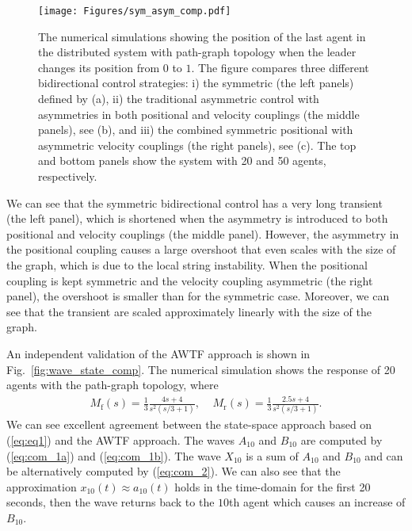 \documentclass[10pt,twocolumn,twoside]{IEEEtran}
\theoremstyle{definition}
\begin{document}
\begin{figure*}[ht]
 \centering
  \texttt{[image: Figures/sym\_asym\_comp.pdf]}
  \caption{
The numerical simulations showing the position of the last agent in the distributed system with path-graph topology when the leader changes its position from $0$ to $1$. The figure compares three different bidirectional control strategies: i) the symmetric (the left panels) defined by (a), ii) the traditional asymmetric control with asymmetries in both positional and velocity couplings (the middle panels), see (b), and iii) the combined symmetric positional with asymmetric velocity couplings (the right panels), see (c). The top and bottom panels show the system with 20 and 50 agents, respectively.}
  \label{fig:sym_asym_comp}
\end{figure*}


We can see that the symmetric bidirectional control has a very long transient (the left panel), which is shortened when the asymmetry is introduced to both positional and velocity couplings (the middle panel). However, the asymmetry in the positional coupling causes a large overshoot that even scales with the size of the graph, which is due to the local string instability. When the positional coupling is kept symmetric and the velocity coupling asymmetric (the right panel), the overshoot is smaller than for the symmetric case. Moreover, we can see that the transient are scaled approximately linearly with the size of the graph.



An independent validation of the AWTF approach is shown in Fig.~\ref{fig:wave_state_comp}. The numerical simulation shows the response of 20 agents with the path-graph topology, where
\begin{align}
  M_{\text{f}}(s) = \frac{1}{3}\frac{4s+4}{s^2(s/3+1)}, \;\;\;\; M_{\text{r}}(s) = \frac{1}{3}\frac{2.5s+4}{s^2(s/3+1)}.
\end{align}
We can see excellent agreement between the state-space approach based on (\ref{eq:eq1}) and the AWTF approach. The waves $A_{10}$ and $B_{10}$ are computed by (\ref{eq:com_1a}) and (\ref{eq:com_1b}). The wave $X_{10}$ is a sum of $A_{10}$ and $B_{10}$ and can be alternatively computed by (\ref{eq:com_2}). We can also see that the approximation $x_{10}(t) \approx a_{10}(t)$ holds in the time-domain for the first 20 seconds, then the wave returns back to the $10$th agent which causes an increase of $B_{10}$.
\end{document}
